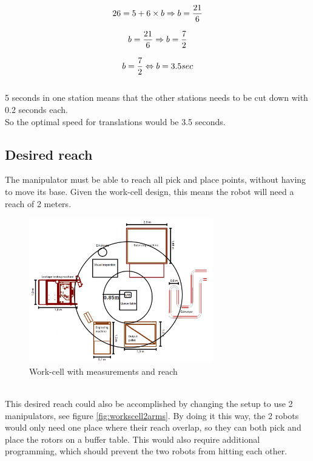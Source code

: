 \begin{equation}
    26 = 5 + 6 \times b \Rightarrow b = \frac{21}{6}\\
\end{equation}

\begin{equation}
    b = \frac{21}{6} \Rightarrow b = \frac{7}{2}\\
\end{equation}

\begin{equation}
    b = \frac{7}{2} \Leftrightarrow  b = 3.5 sec\\
\end{equation}
\\
5 seconds in one station means that the other stations needs to be cut down with 0.2 seconds each.\\
So the optimal speed for translations would be 3.5 seconds.\\

\subsection{Desired reach}

The manipulator must be able to reach all pick and place points, without having to move its base. Given the work-cell design, this means the robot will need a reach of 2 meters. \\
\begin{figure}[H]
    \centering
    \includegraphics[width=8cm]{Design/Work_cell_3.png}
    \caption{Work-cell with measurements and reach}
    \label{fig:workcell}
\end{figure}
\\
This desired reach could also be accomplished by changing the setup to use 2 manipulators, see figure \ref{fig:workscell2arms}. By doing it this way, the 2 robots would only need one place where their reach overlap, so they can both pick and place the rotors on a buffer table. This would also require additional programming, which should prevent the two robots from hitting each other.\\

